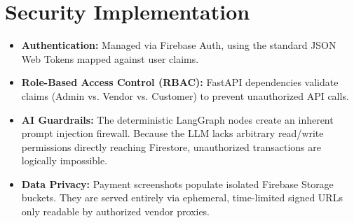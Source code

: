 \section{Security Implementation}
\label{sec:sds-security}
\begin{itemize}
    \item \textbf{Authentication:} Managed via Firebase Auth, using the standard JSON Web Tokens mapped against user claims.
    \item \textbf{Role-Based Access Control (RBAC):} FastAPI dependencies validate claims (Admin vs. Vendor vs. Customer) to prevent unauthorized API calls.
    \item \textbf{AI Guardrails:} The deterministic LangGraph nodes create an inherent prompt injection firewall. Because the LLM lacks arbitrary read/write permissions directly reaching Firestore, unauthorized transactions are logically impossible.
    \item \textbf{Data Privacy:} Payment screenshots populate isolated Firebase Storage buckets. They are served entirely via ephemeral, time-limited signed URLs only readable by authorized vendor proxies.
\end{itemize}

